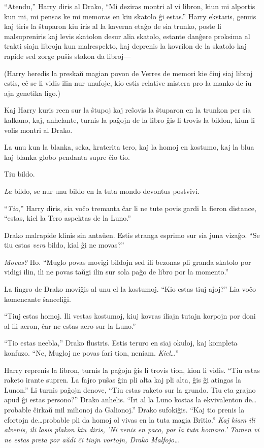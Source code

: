 ``Atendu,'' Harry diris al Drako, ``Mi deziras montri al vi libron,
kiun mi alportis kun mi, mi pensas ke mi memoras en kiu skatolo ĝi
estas.'' Harry ekstaris, genuis kaj tiris la ŝtuparon kiu iris al
la kaverna etaĝo de sia trunko, poste li malsupreniris kaj levis
skatolon desur alia skatolo, estante danĝere proksima al trakti
siajn librojn kun malrespekto, kaj deprenis la kovrilon de la
skatolo kaj rapide sed zorge puŝis stakon da libroj—

(Harry heredis la preskaŭ magian povon de Verres de memori kie ĉiuj
siaj libroj estis, eĉ se li vidis ilin nur unufoje, kio estis relative
mistera pro la manko de iu ajn genetika ligo.)

Kaj Harry kuris reen sur la ŝtupoj kaj reŝovis la ŝtuparon en la
trunkon per sia kalkano, kaj, anhelante, turnis la paĝojn de la libro
ĝis li trovis la bildon, kiun li volis montri al Drako.

La unu kun la blanka, seka, kraterita tero, kaj la homoj en kostumo,
kaj la blua kaj blanka globo pendanta supre ĉio tio.

Tiu bildo.

\emph{La} bildo, se nur unu bildo en la tuta mondo devontus postvivi.

``\emph{Tio},'' Harry diris, sia voĉo tremanta ĉar li ne tute povis
gardi la fieron distance, ``estas, kiel la Tero aspektas de la Luno.''

Drako malrapide klinis sin antaŭen. Estis stranga esprimo sur sia juna
vizaĝo. ``Se tiu estas \emph{vera} bildo, kial ĝi ne movas?''

\emph{Movas?} Ho. ``Muglo povas movigi bildojn sed ili bezonas pli
granda skatolo por vidigi ilin, ili ne povas taŭgi ilin sur sola paĝo
de libro por la momento.''

La fingro de Drako moviĝis al unu el la kostumoj. ``Kio estas tiuj
aĵoj?'' Lia voĉo komencante ŝanceliĝi.

``Tiuj estas homoj. Ili vestas kostumoj, kiuj kovras iliajn tutajn
korpojn por doni al ili aeron, ĉar ne estas aero sur la Luno.''

``Tio estas neebla,'' Drako flustris. Estis teruro en siaj okuloj, kaj
kompleta konfuzo. ``Ne, Mugloj ne povas fari tion,
neniam. \emph{Kiel}\ldots''

Harry reprenis la libron, turnis la paĝojn ĝis li trovis tion, kion li
vidis. ``Tiu estas raketo irante supren. La fajro puŝas ĝin pli alta
kaj pli alta, ĝis ĝi atingas la Lunon.'' Li turnis paĝojn denove,
``Tiu estas raketo sur la grundo. Tiu eta grajno apud ĝi estas
persono?''  Drako anhelis. ``Iri al la Luno kostas la ekvivalenton
de\ldots probable ĉirkaŭ mil milionoj da Galionoj.'' Drako
sufokiĝis. ``Kaj tio prenis la efortojn de\ldots probable pli da homoj
ol vivas en la tuta magia Britio.'' \emph{Kaj kiam ili alvenis, ili
  lasis plakon kiu diris, 'Ni venis en paco, por la tuta homaro.'
  Tamen vi ne estas preta por aŭdi ĉi tiujn vortojn, Drako
  Malfojo\ldots}

